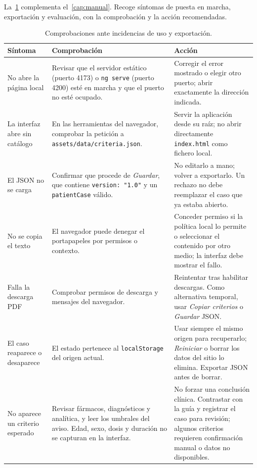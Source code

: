 La~\cref{tab:errores-manual} complementa el~\cref{cap:manual}. Recoge
síntomas de puesta en marcha, exportación y evaluación, con la
comprobación y la acción recomendadas.

\begin{table}[H]
  \centering
  \scriptsize
  \begin{tabularx}{\textwidth}{@{}p{3.8cm}XX@{}}
    \toprule
    \textbf{Síntoma} & \textbf{Comprobación} & \textbf{Acción} \\
    \midrule
    No abre la página local &
      Revisar que el servidor estático (puerto 4173) o \texttt{ng serve}
      (puerto 4200) esté en marcha y que el puerto no esté ocupado. &
      Corregir el error mostrado o elegir otro puerto; abrir exactamente la
      dirección indicada. \\
    La interfaz abre sin catálogo &
      En las herramientas del navegador, comprobar la petición a
      \texttt{assets/data/criteria.json}. &
      Servir la aplicación desde su raíz; no abrir directamente
      \texttt{index.html} como fichero local. \\
    El JSON no se carga &
      Confirmar que procede de \emph{Guardar}, que contiene
      \texttt{version: "1.0"} y un \texttt{patientCase} válido. &
      No editarlo a mano; volver a exportarlo. Un rechazo no debe reemplazar
      el caso que ya estaba abierto. \\
    No se copia el texto &
      El navegador puede denegar el portapapeles por permisos o contexto. &
      Conceder permiso si la política local lo permite o seleccionar el
      contenido por otro medio; la interfaz debe mostrar el fallo. \\
    Falla la descarga PDF &
      Comprobar permisos de descarga y mensajes del navegador. &
      Reintentar tras habilitar descargas. Como alternativa temporal, usar
      \emph{Copiar criterios} o \emph{Guardar} JSON. \\
    El caso reaparece o desaparece &
      El estado pertenece al \texttt{localStorage} del origen actual. &
      Usar siempre el mismo origen para recuperarlo; \emph{Reiniciar} o
      borrar los datos del sitio lo elimina. Exportar JSON antes de borrar. \\
    No aparece un criterio esperado &
      Revisar fármacos, diagnósticos y analítica, y leer los umbrales del
      aviso. Edad, sexo, dosis y duración no se capturan en la interfaz. &
      No forzar una conclusión clínica. Contrastar con la guía y registrar
      el caso para revisión; algunos criterios requieren confirmación manual
      o datos no disponibles. \\
    \bottomrule
  \end{tabularx}
  \caption{Comprobaciones ante incidencias de uso y exportación.}
  \label{tab:errores-manual}
\end{table}

